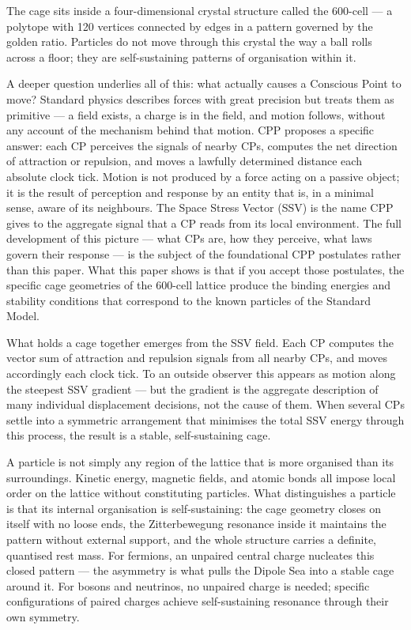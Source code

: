 \documentclass[11pt]{article}
\begin{document}
The cage sits inside a four-dimensional crystal structure called the
600-cell --- a polytope with 120 vertices connected by edges in a
pattern governed by the golden ratio.  Particles do not move through
this crystal the way a ball rolls across a floor; they are
self-sustaining patterns of organisation within it.

A deeper question underlies all of this: what actually causes a
Conscious Point to move?  Standard physics describes forces with great
precision but treats them as primitive --- a field exists, a charge is
in the field, and motion follows, without any account of the mechanism
behind that motion.  CPP proposes a specific answer: each CP perceives
the signals of nearby CPs, computes the net direction of attraction or
repulsion, and moves a lawfully determined distance each absolute clock
tick.  Motion is not produced by a force acting on a passive object; it
is the result of perception and response by an entity that is, in a
minimal sense, aware of its neighbours.  The Space Stress Vector (SSV)
is the name CPP gives to the aggregate signal that a CP reads from its
local environment.  The full development of this picture --- what CPs
are, how they perceive, what laws govern their response --- is the
subject of the foundational CPP postulates rather than this paper.
What this paper shows is that if you accept those postulates, the
specific cage geometries of the 600-cell lattice produce the binding
energies and stability conditions that correspond to the known particles
of the Standard Model.

What holds a cage together emerges from the SSV field.  Each CP computes
the vector sum of attraction and repulsion signals from all nearby CPs,
and moves accordingly each clock tick.  To an outside observer this
appears as motion along the steepest SSV gradient --- but the gradient
is the aggregate description of many individual displacement decisions,
not the cause of them.  When several CPs settle into a symmetric
arrangement that minimises the total SSV energy through this process,
the result is a stable, self-sustaining cage.

A particle is not simply any region of the lattice that is more
organised than its surroundings.  Kinetic energy, magnetic fields, and
atomic bonds all impose local order on the lattice without constituting
particles.  What distinguishes a particle is that its internal
organisation is self-sustaining: the cage geometry closes on itself with
no loose ends, the Zitterbewegung resonance inside it maintains the
pattern without external support, and the whole structure carries a
definite, quantised rest mass.  For fermions, an unpaired central charge
nucleates this closed pattern --- the asymmetry is what pulls the Dipole
Sea into a stable cage around it.  For bosons and neutrinos, no unpaired
charge is needed; specific configurations of paired charges achieve
self-sustaining resonance through their own symmetry.
\end{document}
